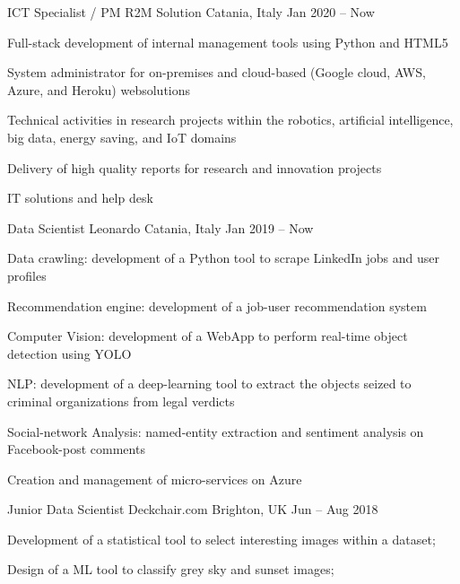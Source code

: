 
  \begin{cventries}
    \cventry
    {ICT Specialist / PM}
    {R2M Solution}    
    {Catania, Italy}
    {Jan 2020 -- Now}
    {
      \begin{cvitems}
        \item {Full-stack development of internal management tools using Python and HTML5}
        \item {System administrator for on-premises and cloud-based (Google cloud, AWS, Azure, and Heroku) websolutions}
        \item {Technical activities in research projects within the robotics, artificial intelligence, big data, energy saving, and IoT domains}
        \item {Delivery of high quality reports for research and innovation projects}
        \item {IT solutions and help desk}
      \end{cvitems}
    }

    \cventry
    {Data Scientist}
    {Leonardo}    
    {Catania, Italy}
    {Jan 2019 -- Now}
    {
      \begin{cvitems}
        \item {Data crawling: development of a Python tool to scrape LinkedIn jobs and user profiles}
        \item {Recommendation engine: development of a job-user recommendation system}
        \item {Computer Vision: development of a WebApp to perform real-time object detection using YOLO}
        \item {NLP: development of a deep-learning tool to extract the objects seized to criminal organizations from legal verdicts}
        \item {Social-network Analysis: named-entity extraction and sentiment analysis on Facebook-post comments}
        \item {Creation and management of micro-services on Azure}
      \end{cvitems}
    }

    \cventry
    {Junior Data Scientist}
    {Deckchair.com}
    {Brighton, UK}
    {Jun -- Aug 2018}
    {
      \begin{cvitems}
        \item Development of a statistical tool to select interesting images within a dataset;
        \item Design of a ML tool to classify grey sky and sunset images;
      \end{cvitems}
    }
  \end{cventries}

